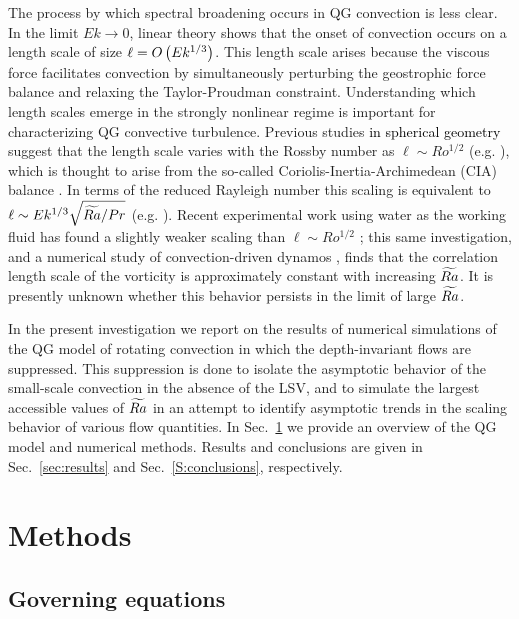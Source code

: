 The process by which spectral broadening occurs in QG convection is less clear. 
In the limit $Ek \rightarrow 0$, linear theory shows that the onset of convection occurs on a length scale of size $\ell = O\left ( Ek ^{1/3}\right )$.
This length scale arises because the viscous force facilitates convection by simultaneously perturbing the geostrophic force balance and relaxing the Taylor-Proudman constraint. 
Understanding which length scales emerge in the strongly nonlinear regime is important for characterizing QG convective turbulence. 
Previous studies \textcolor{black}{in spherical geometry} suggest that the length scale varies with the Rossby number as $\ell \sim Ro^{1/2}$ (e.g. \citep{cG19}), which is thought to arise from the so-called Coriolis-Inertia-Archimedean (CIA) balance \citep{cJ15}. In terms of the reduced Rayleigh number this scaling is equivalent to $\ell \sim Ek^{1/3} \sqrt{\widetilde{Ra}/Pr}$ (e.g. \citep{jmA20}). 
Recent experimental work using water as the working fluid has found a slightly weaker scaling than $\ell \sim Ro^{1/2}$ \citep{mM21}; this same investigation, and a numerical study of convection-driven dynamos \citep{mY22}, finds that the correlation length scale of the vorticity is approximately constant with increasing $\widetilde{Ra}$. It is presently unknown whether this behavior persists in the limit of large $\widetilde{Ra}$. 







In the present investigation we report on the results of numerical simulations of the QG model of rotating convection in which the depth-invariant flows are suppressed. This suppression is done to isolate the asymptotic behavior of the small-scale convection in the absence of the LSV, and to simulate the largest accessible values of $\widetilde{Ra}$ in an attempt to identify asymptotic trends in the scaling behavior of various flow quantities. In Sec.~\ref{S:methods} we provide an overview of the QG model and numerical methods. Results and conclusions are given in  Sec.~\ref{sec:results} and Sec.~\ref{S:conclusions}, respectively. 




\section{Methods}
\label{S:methods}

\subsection{Governing equations}

